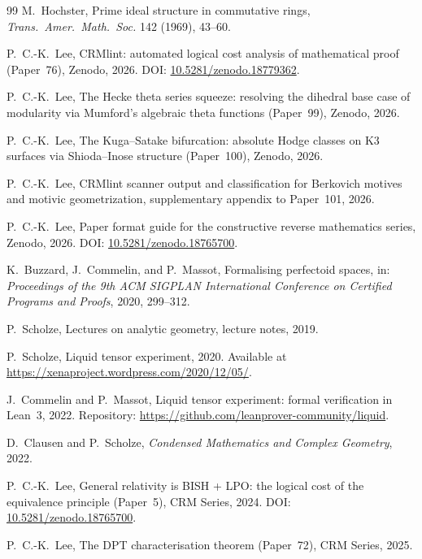 \documentclass[11pt,a4paper]{article}
\theoremstyle{plain}
\theoremstyle{definition}
\begin{document}
\begin{thebibliography}{99}
 M.\ Hochster, Prime ideal structure in commutative rings, \emph{Trans.\ Amer.\ Math.\ Soc.} 142 (1969), 43--60.

 P.\ C.-K.\ Lee, CRMlint: automated logical cost analysis of mathematical proof (Paper~76), Zenodo, 2026. DOI: \href{https://doi.org/10.5281/zenodo.18779362}{10.5281/zenodo.18779362}.

 P.\ C.-K.\ Lee, The Hecke theta series squeeze: resolving the dihedral base case of modularity via Mumford's algebraic theta functions (Paper~99), Zenodo, 2026.

 P.\ C.-K.\ Lee, The Kuga--Satake bifurcation: absolute Hodge classes on K3 surfaces via Shioda--Inose structure (Paper~100), Zenodo, 2026.

 P.\ C.-K.\ Lee, CRMlint scanner output and classification for Berkovich motives and motivic geometrization, supplementary appendix to Paper~101, 2026.

 P.\ C.-K.\ Lee, Paper format guide for the constructive reverse mathematics series, Zenodo, 2026. DOI: \href{https://doi.org/10.5281/zenodo.18765700}{10.5281/zenodo.18765700}.

 K.\ Buzzard, J.\ Commelin, and P.\ Massot, Formalising perfectoid spaces, in: \emph{Proceedings of the 9th ACM SIGPLAN International Conference on Certified Programs and Proofs}, 2020, 299--312.

 P.\ Scholze, Lectures on analytic geometry, lecture notes, 2019.

 P.\ Scholze, Liquid tensor experiment, 2020. Available at \url{https://xenaproject.wordpress.com/2020/12/05/}.

 J.\ Commelin and P.\ Massot, Liquid tensor experiment: formal verification in Lean~3, 2022. Repository: \url{https://github.com/leanprover-community/liquid}.

 D.\ Clausen and P.\ Scholze, \emph{Condensed Mathematics and Complex Geometry}, 2022.

 P.\ C.-K.\ Lee, General relativity is BISH + LPO: the logical cost of the equivalence principle (Paper~5), CRM Series, 2024. DOI: \href{https://doi.org/10.5281/zenodo.18765700}{10.5281/zenodo.18765700}.

 P.\ C.-K.\ Lee, The DPT characterisation theorem (Paper~72), CRM Series, 2025.


\end{thebibliography}
\end{document}
